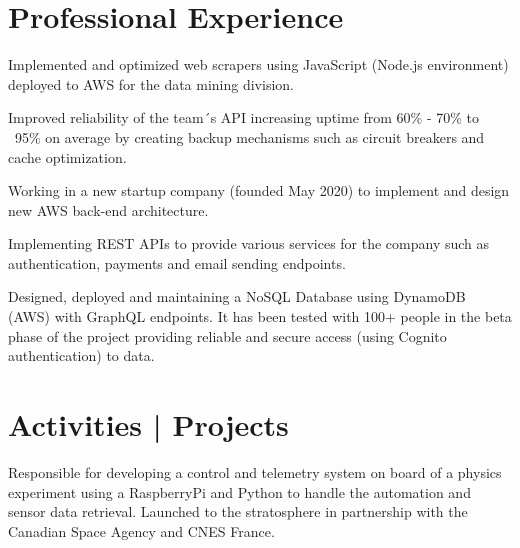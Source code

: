 \documentclass[]{resume-openfont}
\begin{document}
\hfill
\begin{minipage}[t]{0.66\textwidth}


\section{Professional Experience}


\vspace{\topsep} %
\begin{tightemize}
\item Implemented and optimized web scrapers using JavaScript (Node.js environment) deployed to AWS for the data mining division.
\item Improved reliability of the team´s API increasing uptime from 60\% - 70\% to ~95\% on average by creating backup mechanisms such as circuit breakers and cache optimization.
\end{tightemize}

\sectionsep

\vspace{\topsep} %
\begin{tightemize}
\item Working in a new startup company (founded May 2020) to implement and design new AWS back-end architecture.
\item Implementing REST APIs to provide various services for the company such as authentication, payments and email sending endpoints.
\item Designed, deployed and maintaining a NoSQL Database using DynamoDB (AWS) with GraphQL endpoints. It has been tested with 100+ people in the beta phase of the project providing reliable and secure access (using Cognito authentication) to data.
\end{tightemize}

\section{Activities | Projects}
Responsible for developing a control and telemetry system on board of a physics experiment using a RaspberryPi and Python to handle the automation and sensor data retrieval. Launched to the stratosphere in partnership with the Canadian Space Agency and CNES France.
\sectionsep


\end{minipage}
\end{document}
